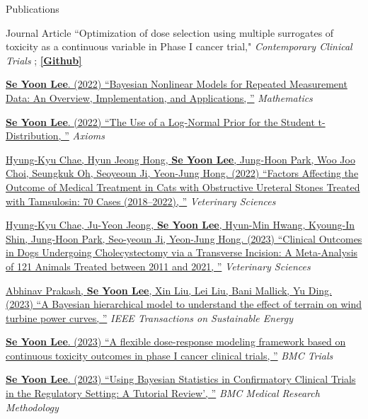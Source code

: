 \documentclass[
	11pt, %
]{resume} %
\begin{document}
\begin{rSection}{Publications}
\begin{rSubsection}{Journal Article}{}{}{}
{``Optimization of dose selection using multiple surrogates of toxicity as a continuous variable in Phase I cancer trial,"}
\textit{Contemporary Clinical Trials} 
;
\href{https://github.com/yain22/2PLD}{\underline{\textbf{[Github]}}}
\item[] [7]
\href{https://www.mdpi.com/2227-7390/10/6/898}
{\underline{\textbf{Se Yoon Lee}}. (2022)
``Bayesian Nonlinear Models for Repeated Measurement Data: An Overview, Implementation, and Applications, ''} \textit{Mathematics} 
\item[] [8]
\href{https://www.mdpi.com/2075-1680/11/9/462}
{\underline{\textbf{Se Yoon Lee}}. (2022)
``The Use of a Log-Normal Prior for the Student t-Distribution, ''} \textit{Axioms} 
\item[] [9]
\href{https://www.mdpi.com/2306-7381/9/10/568}
{Hyung-Kyu Chae, Hyun Jeong Hong, \underline{\textbf{Se Yoon Lee}}, Jung-Hoon Park, Woo Joo Choi, Seungkuk Oh, Seoyeoun Ji, Yeon-Jung Hong. (2022)
``Factors Affecting the Outcome of Medical Treatment in Cats with Obstructive Ureteral Stones Treated with Tamsulosin: 70 Cases (2018–2022), ''} \textit{Veterinary Sciences} 
\item[] [10]
\href{https://www.mdpi.com/2306-7381/10/6/395}
{Hyung-Kyu Chae, Ju-Yeon Jeong, \underline{\textbf{Se Yoon Lee}}, Hyun-Min Hwang, Kyoung-In Shin, Jung-Hoon Park, Seo-yeoun Ji, Yeon-Jung Hong. (2023)
``Clinical Outcomes in Dogs Undergoing Cholecystectomy via
a Transverse Incision: A Meta-Analysis of 121 Animals Treated
between 2011 and 2021, ''} \textit{Veterinary Sciences} 
\item[] [11]
\href{https://ieeexplore.ieee.org/document/10301539}
{Abhinav Prakash, \underline{\textbf{Se Yoon Lee}}, Xin Liu, Lei Liu,  Bani Mallick, Yu Ding. (2023)
``A Bayesian hierarchical model to understand the effect of terrain on wind turbine power curves, ''} \textit{IEEE Transactions on Sustainable Energy} 
\item[] [12]
\href{https://trialsjournal.biomedcentral.com/articles/10.1186/s13063-023-07793-0}
{\underline{\textbf{Se Yoon Lee}}. (2023)
``A flexible dose-response modeling framework based on continuous toxicity outcomes in phase I cancer clinical trials, ''} \textit{BMC Trials} 
\item[] [13]
\href{https://bmcmedresmethodol.biomedcentral.com/articles/10.1186/s12874-024-02235-0}
{\underline{\textbf{Se Yoon Lee}}. (2023)
	``Using Bayesian Statistics in Confirmatory Clinical Trials in the Regulatory Setting: A Tutorial Review', ''} \textit{BMC Medical Research Methodology} 
\end{rSubsection}


\end{rSection}
\end{document}
